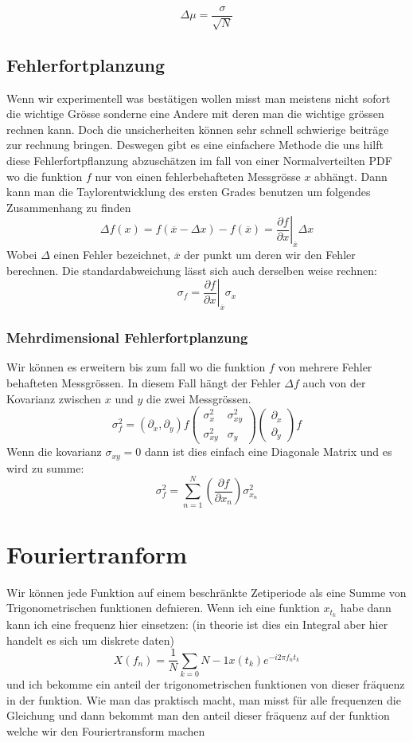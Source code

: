 \documentclass{article}
\begin{document}
\[\Delta \mu=\frac{\sigma}{\sqrt{N}}\]
\hypertarget{fehlerfortplanzung}{\subsection*{Fehlerfortplanzung}}
Wenn wir experimentell was bestätigen wollen misst man meistens nicht sofort die wichtige Grösse sonderne eine Andere mit
deren man die wichtige grössen rechnen kann. Doch die unsicherheiten können sehr schnell schwierige beiträge zur rechnung bringen.
Deswegen gibt es eine einfachere Methode die uns hilft diese Fehlerfortpflanzung abzuschätzen im fall von einer Normalverteilten PDF
wo die funktion $f$ nur von einen fehlerbehafteten Messgrösse $x$ abhängt. 
Dann kann man die Taylorentwicklung des ersten Grades benutzen um folgendes Zusammenhang zu finden
\[\Delta f(x)=f(\overline{x}-\Delta x)-f(\overline{x})=\left.\frac{\partial f}{\partial x}\right|_{\overline{x}}\Delta x\]
Wobei $\Delta$ einen Fehler bezeichnet, $\overline{x}$ der punkt um deren wir den Fehler berechnen. Die standardabweichung lässt sich auch derselben weise rechnen:
\[\sigma_f=\left.\frac{\partial f}{\partial x}\right|_ {\overline{x}}\sigma_x\]
\hypertarget{mehrdimensionaleFehlerfortpflanzung}{\subsubsection*{Mehrdimensional Fehlerfortplanzung}}
Wir können es erweitern bis zum fall wo die funktion $f$ von mehrere Fehler behafteten Messgrössen. In diesem Fall hängt der
Fehler $\Delta f$ auch von der Kovarianz zwischen $x$ und $y$ die zwei Messgrössen.
\[\sigma_f^2=(\partial_x,\partial_y)f\begin{pmatrix}\sigma_x^2&\sigma_{xy}^2\\\sigma_{xy}^2&\sigma_y\end{pmatrix}\begin{pmatrix}\partial_x\\\partial_y\end{pmatrix}f\]
Wenn die kovarianz $\sigma_{xy}=0$ dann ist dies einfach eine Diagonale Matrix und es wird zu summe:
\[\sigma_f^2=\sum_{n=1}^N\left(\frac{\partial f}{\partial x_n}\right)\sigma_{x_n}^2\]
\section*{Fouriertranform}
Wir können jede Funktion auf einem beschränkte Zetiperiode als eine Summe von Trigonometrischen funktionen defnieren. Wenn ich eine funktion $x_{t_k}$ habe dann kann ich eine frequenz hier einsetzen: (in theorie ist dies ein Integral aber hier handelt es sich um diskrete daten)
\[X(f_n)=\frac{1}{N}\sum_{k=0}{N-1}x(t_k)e^{-i2\pi f_nt_k}\]
und ich bekomme ein anteil der trigonometrischen funktionen von dieser fräquenz in der funktion.\newline
Wie man das praktisch macht, man misst für alle frequenzen die Gleichung und dann bekommt man den anteil dieser fräquenz auf der funktion welche wir den Fouriertransform machen
\end{document}
